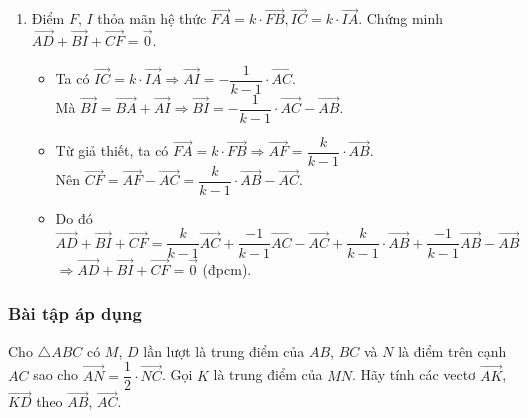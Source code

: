 \begin{vd}
{\begin{enumerate}
\begin{itemize}
				Ta có $\overrightarrow{DE}=\overrightarrow{AE}-\overrightarrow{AD}$. \qquad $(3)$\\
				Thay $(1)$, $(2)$ vào $(3)$ và rút gọn, ta được $\overrightarrow{DE}=\dfrac{k+1}{k-1}\left(\overrightarrow{AB}-\overrightarrow{AC}\right)$.
			\end{itemize}
			\item Điểm $F$, $I$ thỏa mãn hệ thức $\overrightarrow{FA}=k\cdot \overrightarrow{FB},\overrightarrow{IC}=k\cdot \overrightarrow{IA}$. Chứng minh $\overrightarrow{AD}+\overrightarrow{BI}+\overrightarrow{CF}=\overrightarrow{0}$.
			\begin{itemize}
				\item Ta có $\overrightarrow{IC}=k\cdot \overrightarrow{IA}\Rightarrow \overrightarrow{AI}=-\dfrac{1}{k-1}\cdot \overrightarrow{AC}$.\\
				Mà $\overrightarrow{BI}=\overrightarrow{BA}+\overrightarrow{AI}\Rightarrow \overrightarrow{BI}=-\dfrac{1}{k-1}\cdot \overrightarrow{AC}-\overrightarrow{AB}$.
				\item Từ giả thiết, ta có $\overrightarrow{FA}=k\cdot \overrightarrow{FB}\Rightarrow \overrightarrow{AF}=\dfrac{k}{k-1}\cdot \overrightarrow{AB}$.\\
				Nên  $\overrightarrow{CF}=\overrightarrow{AF}-\overrightarrow{AC}=\dfrac{k}{k-1}\cdot \overrightarrow{AB}-\overrightarrow{AC}$.
				\item Do đó $\overrightarrow{AD}+\overrightarrow{BI}+\overrightarrow{CF}=\dfrac{k}{k-1}\overrightarrow{AC}+\dfrac{-1}{k-1}\overrightarrow{AC}-\overrightarrow{AC}+\dfrac{k}{k-1}\cdot \overrightarrow{AB}+\dfrac{-1}{k-1}\overrightarrow{AB}-\overrightarrow{AB}$\\
				$\Rightarrow \overrightarrow{AD}+\overrightarrow{BI}+\overrightarrow{CF}=\overrightarrow{0}$ (đpcm).
			\end{itemize}
		\end{enumerate}
	}
\end{vd}
\subsubsection{Bài tập áp dụng}
\begin{bt}%
	Cho $\triangle ABC$ có $M$, $D$ lần lượt là trung điểm của $AB$, $BC$ và $N$ là điểm trên cạnh $AC$ sao cho $\overrightarrow{AN}=\dfrac{1}{2}\cdot \overrightarrow{NC}$. Gọi $K$ là trung điểm của $MN$. Hãy tính các vectơ $\overrightarrow{AK}$, $\overrightarrow{KD}$ theo $\overrightarrow{AB}$, $\overrightarrow{AC}$.
\end{bt}


